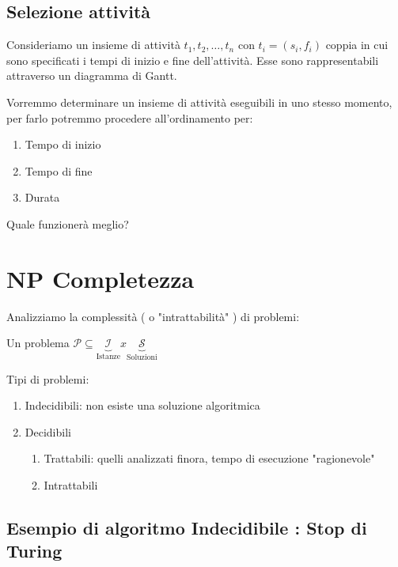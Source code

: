 \documentclass[11pt,a4paper,twoside,openright]{book}
\begin{document}
{{\subsection{Selezione attività}

Consideriamo un insieme di attività $t_1, t_2, \ldots , t_n$ con $t_i = (s_i, f_i)$ coppia in cui sono specificati i tempi di inizio e fine dell'attività. Esse sono rappresentabili attraverso un diagramma di Gantt.



Vorremmo determinare un insieme di attività eseguibili in uno stesso momento, per farlo potremmo procedere all'ordinamento per:

\begin{enumerate}
\item Tempo di inizio
\item Tempo di fine
\item Durata
\end{enumerate}

Quale funzionerà meglio?

\pagebreak
\section{NP Completezza}

Analizziamo la complessità ( o  "intrattabilità" ) di problemi:

Un problema $\mathcal{P} \subseteq \underbrace{\mathcal{I} }_\text{Istanze} x  \underbrace{\mathcal{S} }_\text{Soluzioni}$ 

Tipi di problemi: 

\begin{enumerate}

\item Indecidibili: non esiste una soluzione algoritmica
\item Decidibili
\begin{enumerate}
\item Trattabili: quelli analizzati finora, tempo di esecuzione "ragionevole"
\item Intrattabili
\end{enumerate}

\end{enumerate}

\subsection{Esempio di algoritmo Indecidibile : Stop di Turing}

}}
\end{document}
